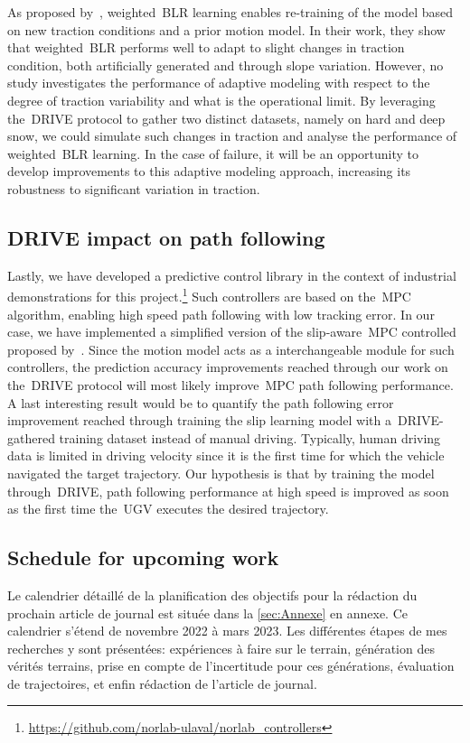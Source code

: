 As proposed by~\citet{Mckinnon2019}, weighted~\ac{BLR} learning enables re-training of the model based on new traction conditions and a prior motion model.
In their work, they show that weighted~\ac{BLR} performs well to adapt to slight changes in traction condition, both artificially generated and through slope variation.
However, no study investigates the performance of adaptive modeling with respect to the degree of traction variability and what is the operational limit.
By leveraging the~\ac{DRIVE} protocol to gather two distinct datasets, namely on hard and deep snow, we could simulate such changes in traction and analyse the performance of weighted~\ac{BLR} learning.
In the case of failure, it will be an opportunity to develop improvements to this adaptive modeling approach, increasing its robustness to significant variation in traction.

\subsection{\ac{DRIVE} impact on path following}
Lastly, we have developed a predictive control library in the context of industrial demonstrations for this project.\footnote{\url{https://github.com/norlab-ulaval/norlab_controllers}}
Such controllers are based on the~\ac{MPC} algorithm, enabling high speed path following with low tracking error.
In our case, we have implemented a simplified version of the slip-aware~\ac{MPC} controlled proposed by~\citet{Hewing2020}.
Since the motion model acts as a interchangeable module for such controllers, the prediction accuracy improvements reached through our work on the~\ac{DRIVE} protocol will most likely improve~\ac{MPC} path following performance.
A last interesting result would be to quantify the path following error improvement reached through training the slip learning model with a~\ac{DRIVE}-gathered training dataset instead of manual driving.
Typically, human driving data is limited in driving velocity since it is the first time for which the vehicle navigated the target trajectory.
Our hypothesis is that by training the model through~\ac{DRIVE}, path following performance at high speed is improved as soon as the first time the~\ac{UGV} executes the desired trajectory.

\subsection{Schedule for upcoming work}
\label{sec:schedule}

Le calendrier détaillé de la planification des objectifs pour la rédaction du prochain article de journal est située dans la \autoref{sec:Annexe} en annexe.
Ce calendrier s'étend de novembre 2022 à mars 2023.
Les différentes étapes de mes recherches y sont présentées: expériences à faire sur le terrain, génération des vérités terrains, prise en compte de l'incertitude pour ces générations, évaluation de trajectoires, et enfin rédaction de l'article de journal.

